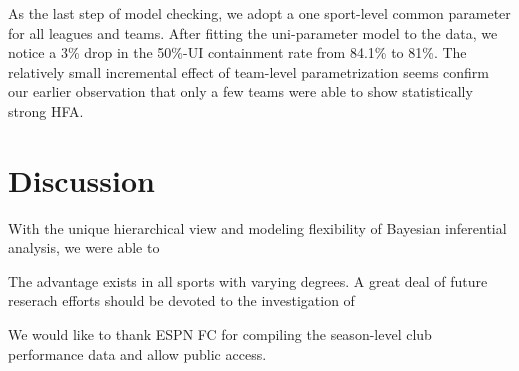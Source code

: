 \documentclass[USenglish]{article}
\begin{document}
As the last step of model checking, we adopt a one sport-level common parameter for all leagues and teams. After fitting the uni-parameter model to the data, we notice a 3\%  drop in the 50\%-UI containment rate from 84.1\% to 81\%.
The relatively small incremental effect of team-level parametrization seems confirm our earlier observation that only a few teams were able to show statistically strong HFA.



\section{Discussion}

With the unique hierarchical view and modeling flexibility of Bayesian inferential analysis, we were able to   

The advantage exists in all sports with varying degrees. A great deal of future reserach efforts should be devoted to the investigation of 

\newpage
\begin{acknowledgement}

We would like to thank ESPN FC for compiling the season-level club performance data and allow public access.

\end{acknowledgement}

\newpage

%

\end{document}
